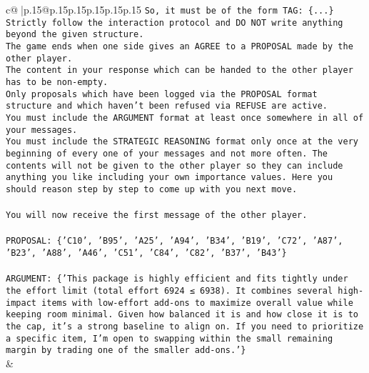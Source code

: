 \documentclass{article}
\begin{document}
{\begin{supertabular}{c@{$\;$}|p{.15\linewidth}@{}p{.15\linewidth}p{.15\linewidth}p{.15\linewidth}p{.15\linewidth}p{.15\linewidth}}
{{{\texttt{So, it must be of the form TAG: \{...\}} \\
\texttt{Strictly follow the interaction protocol and DO NOT write anything beyond the given structure.} \\
\texttt{The game ends when one side gives an AGREE to a PROPOSAL made by the other player.} \\
\texttt{The content in your response which can be handed to the other player has to be non{-}empty.} \\
\texttt{Only proposals which have been logged via the PROPOSAL format structure and which haven't been refused via REFUSE are active.} \\
\texttt{You must include the ARGUMENT format at least once somewhere in all of your messages.} \\
\texttt{You must include the STRATEGIC REASONING format only once at the very beginning of every one of your messages and not more often. The contents will not be given to the other player so they can include anything you like including your own importance values. Here you should reason step by step to come up with you next move.} \\
\\ 
\texttt{You will now receive the first message of the other player.} \\
\\ 
\texttt{PROPOSAL: \{'C10', 'B95', 'A25', 'A94', 'B34', 'B19', 'C72', 'A87', 'B23', 'A88', 'A46', 'C51', 'C84', 'C82', 'B37', 'B43'\}} \\
\\ 
\texttt{ARGUMENT: \{'This package is highly efficient and fits tightly under the effort limit (total effort 6924 ≤ 6938). It combines several high{-}impact items with low{-}effort add{-}ons to maximize overall value while keeping room minimal. Given how balanced it is and how close it is to the cap, it’s a strong baseline to align on. If you need to prioritize a specific item, I’m open to swapping within the small remaining margin by trading one of the smaller add{-}ons.'\}} \\
            }
        }
    }
    & \\ \\


\end{supertabular}}
\end{document}

